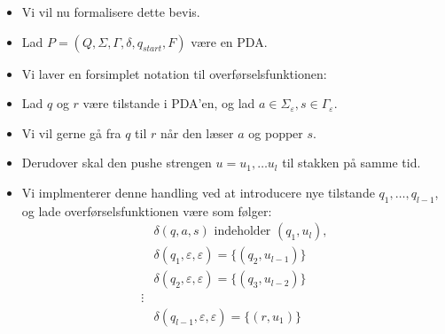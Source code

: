\begin{frame}[allowframebreaks]
\begin{itemize}
		\item Vi vil nu formalisere dette bevis.
		\item Lad $P = (Q, \Sigma, \Gamma, \delta, q_{start}, F)$ være en PDA.
		\item Vi laver en forsimplet notation til overførselsfunktionen:
		\item Lad $q$ og $r$ være tilstande i PDA'en, og lad $a \in \Sigma_{\varepsilon}, s \in \Gamma_{ \varepsilon}$.
		\item Vi vil gerne gå fra $q$ til $r$ når den læser $a$ og popper $s$.
		\item Derudover skal den pushe strengen $u = u_{1}, \ldots u_{l}$ til stakken på samme tid.
		\item Vi implmenterer denne handling ved at introducere nye tilstande $q_{1}, \ldots, q_{l-1}$, og lade overførselsfunktionen være som følger:
		      \begin{align*}
			       & \delta(q,a,s) \text{ indeholder } (q_{1}, u_{l}),              \\
			       & \delta(q_{1}, \varepsilon, \varepsilon) = \{(q_{2}, u_{l-1})\} \\
			       & \delta(q_{2}, \varepsilon, \varepsilon) = \{(q_{3}, u_{l-2})\} \\
			      \vdots                                                            \\
			       & \delta(q_{l-1}, \varepsilon, \varepsilon) = \{(r, u_{1})\}
		      \end{align*}


\end{itemize}
\end{frame}
